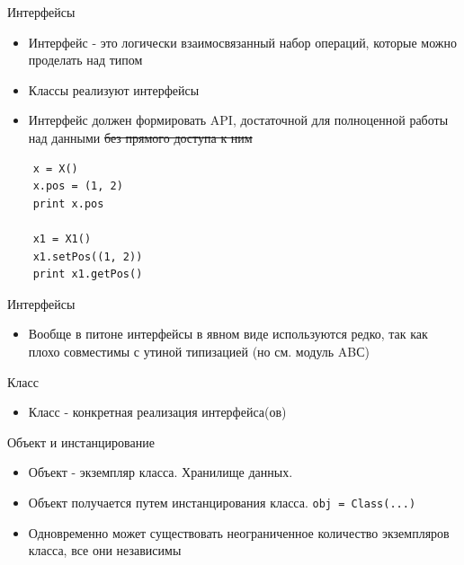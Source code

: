 \documentclass{article}
\begin{document}
\LARGE

\begin{center} Интерфейсы \end{center}
\begin{itemize}
    \item Интерфейс - это логически взаимосвязанный набор операций, 
          которые можно проделать над типом
    \item Классы реализуют интерфейсы
    \item Интерфейс должен формировать API, достаточной для полноценной 
          работы над данными \sout{без прямого доступа к ним}
\end{itemize}
\newpage

\begin{lstlisting}
    x = X()
    x.pos = (1, 2)
    print x.pos

    x1 = X1()
    x1.setPos((1, 2))
    print x1.getPos()
\end{lstlisting}
\newpage

\begin{center} Интерфейсы \end{center}
\begin{itemize}
    \item Вообще в питоне интерфейсы в явном виде используются редко, 
          так как плохо совместимы с утиной типизацией (но см. модуль ABС)
\end{itemize}
\newpage

\begin{center} Класс \end{center}
\begin{itemize}
    \item Класс - конкретная реализация интерфейса(ов)
\end{itemize}
\newpage

\begin{center} Объект и инстанцирование \end{center}
\begin{itemize}
    \item Объект - экземпляр класса. Хранилище данных.
    \item Объект получается путем инстанцирования класса. 
           \lstinline!obj = Class(...)!
    \item Одновременно может существовать неограниченное количество 
          экземпляров класса, все они независимы
\end{itemize}
\newpage
\end{document}
